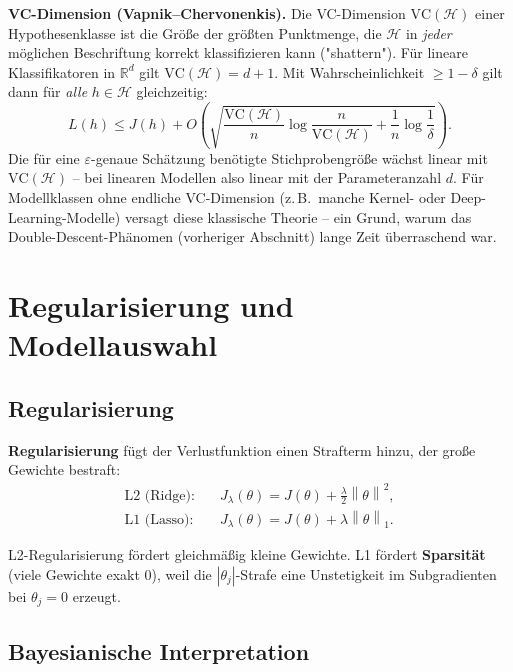 \documentclass[11pt]{article}
\theoremstyle{csthm}
\theoremstyle{csdef}
\newcommand{\R}{\mathbb{R}}
\newcommand{\norm}[1]{\left\|#1\right\|}
\begin{document}
\begin{tcolorbox}[defstyle]
\textbf{VC-Dimension (Vapnik--Chervonenkis).} Die VC-Dimension
$\mathrm{VC}(\mathcal H)$ einer Hypothesenklasse ist die Größe der größten
Punktmenge, die $\mathcal H$ in \emph{jeder} möglichen Beschriftung korrekt
klassifizieren kann ("shattern"). Für lineare Klassifikatoren in $\R^d$ gilt
$\mathrm{VC}(\mathcal H) = d+1$. Mit Wahrscheinlichkeit $\geq 1-\delta$ gilt
dann für \emph{alle} $h \in \mathcal H$ gleichzeitig:
\begin{equation}
  L(h) \leq J(h) + O\!\left(\sqrt{\frac{\mathrm{VC}(\mathcal H)}{n}
    \log\frac{n}{\mathrm{VC}(\mathcal H)} + \frac1n\log\frac1\delta}\right).
\end{equation}
Die für eine $\varepsilon$-genaue Schätzung benötigte Stichprobengröße wächst
linear mit $\mathrm{VC}(\mathcal H)$ -- bei linearen Modellen also linear mit
der Parameteranzahl $d$. Für Modellklassen ohne endliche VC-Dimension
(z.\,B.\ manche Kernel- oder Deep-Learning-Modelle) versagt diese klassische
Theorie -- ein Grund, warum das Double-Descent-Phänomen (vorheriger
Abschnitt) lange Zeit überraschend war.
\end{tcolorbox}

\section{Regularisierung und Modellauswahl}

\subsection{Regularisierung}

\textbf{Regularisierung} fügt der Verlustfunktion einen Strafterm hinzu, der
große Gewichte bestraft:
\begin{align}
  \text{L2 (Ridge):} &\quad J_\lambda(\theta) = J(\theta) + \tfrac{\lambda}{2}\norm{\theta}^2, \\
  \text{L1 (Lasso):} &\quad J_\lambda(\theta) = J(\theta) + \lambda\norm{\theta}_1.
\end{align}

L2-Regularisierung fördert gleichmäßig kleine Gewichte. L1 fördert
\textbf{Sparsität} (viele Gewichte exakt 0), weil die $|\theta_j|$-Strafe
eine Unstetigkeit im Subgradienten bei $\theta_j = 0$ erzeugt.

\subsection{Bayesianische Interpretation}
\end{document}
